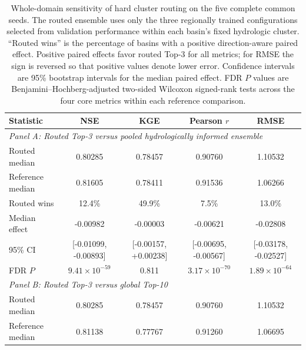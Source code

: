 \begin{table}[htbp]
\centering
\caption{Whole-domain sensitivity of hard cluster routing on the five complete
common seeds. The routed ensemble uses only the three regionally trained
configurations selected from validation performance within each basin's fixed
hydrologic cluster. ``Routed wins'' is the percentage of basins with a positive
direction-aware paired effect. Positive paired effects favor routed Top-3 for
all metrics; for RMSE the sign is reversed so that positive values denote lower
error. Confidence intervals are 95\% bootstrap intervals for the median paired
effect. FDR $P$ values are Benjamini--Hochberg-adjusted two-sided Wilcoxon
signed-rank tests across the four core metrics within each reference
comparison.}
\label{tab:supp_cluster_routing_overall}

\footnotesize
\renewcommand{\arraystretch}{1.15}
\setlength{\tabcolsep}{6pt}

\begin{tabular}{lcccc}
\toprule
Statistic & NSE & KGE & Pearson $r$ & RMSE \\
\midrule

\multicolumn{5}{l}{\textit{Panel A: Routed Top-3 versus pooled hydrologically informed ensemble}} \\
\midrule
Routed median
& 0.80285
& 0.78457
& 0.90760
& 1.10532 \\

Reference median
& 0.81605
& 0.78411
& 0.91536
& 1.06266 \\

Routed wins
& 12.4\%
& 49.9\%
& 7.5\%
& 13.0\% \\

Median effect
& -0.00982
& -0.00003
& -0.00621
& -0.02808 \\

95\% CI
& [-0.01099, -0.00893]
& [-0.00157, +0.00238]
& [-0.00695, -0.00567]
& [-0.03178, -0.02527] \\

FDR $P$
& $9.41\times10^{-59}$
& 0.811
& $3.17\times10^{-70}$
& $1.89\times10^{-64}$ \\

\midrule
\multicolumn{5}{l}{\textit{Panel B: Routed Top-3 versus global Top-10}} \\
\midrule
Routed median
& 0.80285
& 0.78457
& 0.90760
& 1.10532 \\

Reference median
& 0.81138
& 0.77767
& 0.91260
& 1.06695 \\


\end{tabular}
\end{table}
